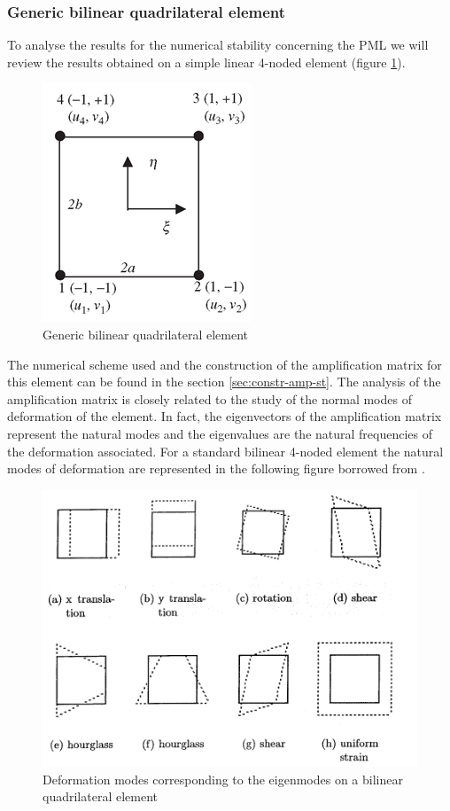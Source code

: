 \subsubsection{Generic bilinear quadrilateral element}
To analyse the results for the numerical stability concerning the PML we will review the results obtained on a simple linear 4-noded element (figure \ref{fig:4nodes}).
\begin{figure}[H]
\centering
\includegraphics[scale=0.5]{images/square2d.png}
\caption{Generic bilinear quadrilateral element}
\label{fig:4nodes}
\end{figure}
The numerical scheme used and the construction of the amplification matrix for this element can be found in the section \ref{sec:constr-amp-st}. 
The analysis of the amplification matrix is closely related to the study of the normal modes of deformation of the element. In fact, the eigenvectors of the amplification matrix represent the natural modes and the eigenvalues are the natural frequencies of the deformation associated. For a standard bilinear 4-noded element the natural modes of deformation are represented in the following figure borrowed from \cite{Ling2002}.
\begin{figure}[H]
\centering
\includegraphics[scale=0.5]{images/def-modes.png}
\caption{Deformation modes corresponding to the eigenmodes on a bilinear quadrilateral element}
\label{fig:def-modes}
\end{figure}

